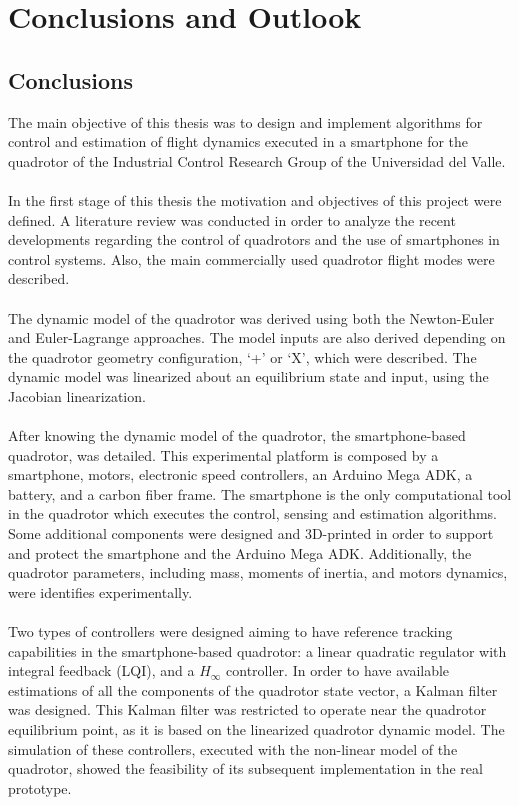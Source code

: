 \chapter{Conclusions and Outlook \label{ch:conclusions}}
\section{Conclusions}
The main objective of this thesis was to design and implement algorithms for control and estimation of flight dynamics executed in a smartphone for the quadrotor of the Industrial Control Research Group of the Universidad del Valle.
\\\\
In the first stage of this thesis the motivation and objectives of this project were defined. A literature review was conducted in order to analyze the recent developments regarding the control of quadrotors and the use of smartphones in control systems. Also, the main commercially used quadrotor flight modes were described.
\\\\
The dynamic model of the quadrotor was derived using both the Newton-Euler and Euler-Lagrange approaches. The model inputs are also derived depending on the quadrotor geometry configuration, `+' or `X', which were described. The dynamic model was linearized about an equilibrium state and input, using the Jacobian linearization.
\\\\
After knowing the dynamic model of the quadrotor, the smartphone-based quadrotor, was detailed. This experimental platform is composed by a smartphone, motors, electronic speed controllers, an Arduino Mega ADK, a battery, and a carbon fiber frame. The smartphone is the only computational tool in the quadrotor which executes the control, sensing and estimation algorithms. Some additional components were designed and 3D-printed in order to support and protect the smartphone and the Arduino Mega ADK. Additionally, the quadrotor parameters, including mass, moments of inertia, and motors dynamics, were identifies experimentally.
\\\\
Two types of controllers were designed aiming to have reference tracking capabilities in the smartphone-based quadrotor: a linear quadratic regulator with integral feedback (LQI), and a $H_\infty$ controller. In order to have available estimations of all the components of the quadrotor state vector, a Kalman filter was designed. This Kalman filter was restricted to operate near the quadrotor equilibrium point, as it is based on the linearized quadrotor dynamic model. The simulation of these controllers, executed with the non-linear model of the quadrotor, showed the feasibility of its subsequent implementation in the real prototype.
